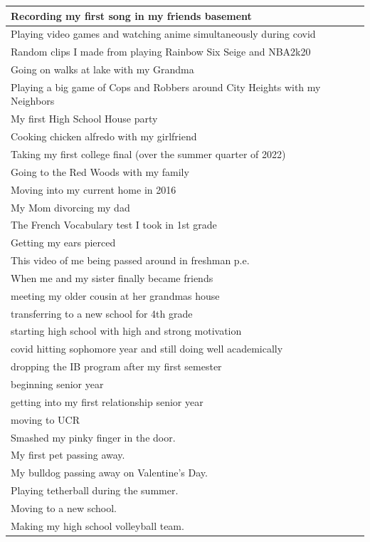\documentclass[
  .7em,
  letterpaper,
  DIV=11,
  numbers=noendperiod]{scrartcl}
\begin{document}
\begin{table}
\begin{tabular}{l}
\hline
Recording my first song in my friends basement\\
\hline
Playing video games and watching anime simultaneously during covid\\
\hline
Random clips I made from playing Rainbow Six Seige and NBA2k20\\
\hline
Going on walks at lake with my Grandma\\
\hline
Playing a big game of Cops and Robbers around City Heights with my Neighbors\\
\hline
My first High School House party\\
\hline
Cooking chicken alfredo with my girlfriend\\
\hline
Taking my first college final (over the summer quarter of 2022)\\
\hline
Going to the Red Woods with my family\\
\hline
Moving into my current home in 2016\\
\hline
My Mom divorcing my dad\\
\hline
The French Vocabulary test I took in 1st grade\\
\hline
Getting my ears pierced\\
\hline
This video of me being passed around in freshman p.e.\\
\hline
When me and my sister finally became friends\\
\hline
meeting my older cousin at her grandmas house\\
\hline
transferring to a new school for 4th grade\\
\hline
starting high school with high and strong motivation\\
\hline
covid hitting sophomore year and still doing well academically\\
\hline
dropping the IB program after my first semester\\
\hline
beginning senior year\\
\hline
getting into my first relationship senior year\\
\hline
moving to UCR\\
\hline
Smashed my pinky finger in the door.\\
\hline
My first pet passing away.\\
\hline
My bulldog passing away on Valentine’s Day.\\
\hline
Playing tetherball during the summer.\\
\hline
Moving to a new school.\\
\hline
Making my high school volleyball team.\\

\end{tabular}
\end{table}
\end{document}
